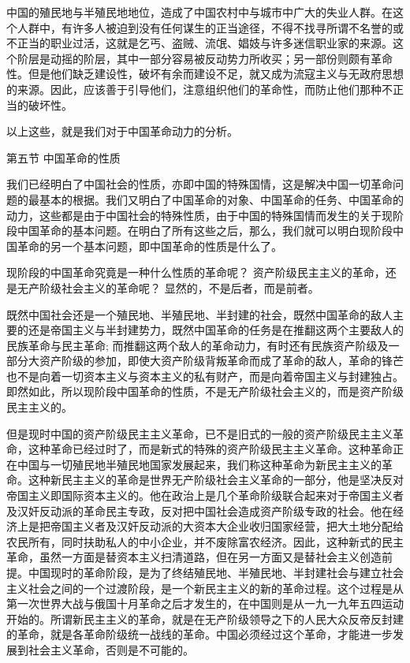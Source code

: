 \documentclass[UTF8, 12pt, a4paper]{ctexrep}
\begin{document}
中国的殖民地与半殖民地地位，造成了中国农村中与城市中广大的失业人群。在这个人群中，有许多人被迫到没有任何谋生的正当途径，不得不找寻所谓不名誉的或不正当的职业过活，这就是乞丐、盗贼、流氓、娼妓与许多迷信职业家的来源。这个阶层是动摇的阶层，其中一部分容易被反动势力所收买；另一部份则颇有革命性。但是他们缺乏建设性，破坏有余而建设不足，就又成为流寇主义与无政府思想的来源。因此，应该善于引导他们，注意组织他们的革命性，而防止他们那种不正当的破坏性。

以上这些，就是我们对于中国革命动力的分析。

第五节 中国革命的性质

我们已经明白了中国社会的性质，亦即中国的特殊国情，这是解决中国一切革命问题的最基本的根据。我们又明白了中国革命的对象、中国革命的任务、中国革命的动力，这些都是由于中国社会的特殊性质，由于中国的特殊国情而发生的关于现阶段中国革命的基本问题。在明白了所有这些之后，那么，我们就可以明白现阶段中国革命的另一个基本问题，即中国革命的性质是什么了。

现阶段的中国革命究竟是一种什么性质的革命呢？ 资产阶级民主主义的革命，还是无产阶级社会主义的革命呢？ 显然的，不是后者，而是前者。

既然中国社会还是一个殖民地、半殖民地、半封建的社会，既然中国革命的敌人主要的还是帝国主义与半封建势力，既然中国革命的任务是在推翻这两个主要敌人的民族革命与民主革命; 而推翻这两个敌人的革命动力，有时还有民族资产阶级及一部分大资产阶级的参加，即使大资产阶级背叛革命而成了革命的敌人，革命的锋芒也不是向着一切资本主义与资本主义的私有财产，而是向着帝国主义与封建独占。即然如此，所以现阶段中国革命的性质，不是无产阶级社会主义的，而是资产阶级民主主义的。

但是现时中国的资产阶级民主主义革命，已不是旧式的一般的资产阶级民主主义革命，这种革命已经过时了，而是新式的特殊的资产阶级民主主义革命。这种革命正在中国与一切殖民地半殖民地国家发展起来，我们称这种革命为新民主主义的革命。这种新民主主义的革命是世界无产阶级社会主义革命的一部分，他是坚决反对帝国主义即国际资本主义的。他在政治上是几个革命阶级联合起来对于帝国主义者及汉奸反动派的革命民主专政，反对把中国社会造成资产阶级专政的社会。他在经济上是把帝国主义者及汉奸反动派的大资本大企业收归国家经营，把大土地分配给农民所有，同时扶助私人的中小企业，并不废除富农经济。因此，这种新式的民主革命，虽然一方面是替资本主义扫清道路，但在另一方面又是替社会主义创造前提。中国现时的革命阶段，是为了终结殖民地、半殖民地、半封建社会与建立社会主义社会之间的一个过渡阶段，是一个新民主主义的新的革命过程。这个过程是从第一次世界大战与俄国十月革命之后才发生的，在中国则是从一九一九年五四运动开始的。所谓新民主主义的革命，就是在无产阶级领导之下的人民大众反帝反封建的革命，就是各革命阶级统一战线的革命。中国必须经过这个革命，才能进一步发展到社会主义革命，否则是不可能的。
\end{document}
